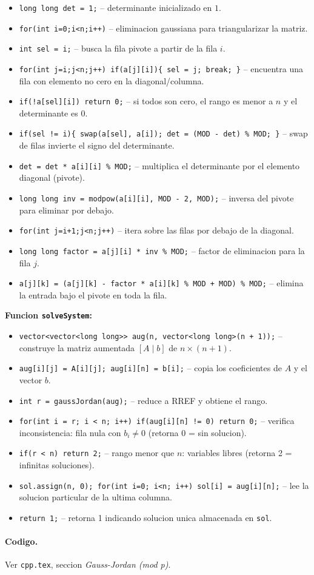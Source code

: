 \begin{itemize}\setlength\itemsep{0pt}
	\item \verb|long long det = 1;| -- determinante inicializado en $1$.
	\item \verb|for(int i=0;i<n;i++)| -- eliminacion gaussiana para triangularizar la matriz.
	\item \verb|int sel = i;| -- busca la fila pivote a partir de la fila $i$.
	\item \verb|for(int j=i;j<n;j++) if(a[j][i]){ sel = j; break; }| -- encuentra una fila con elemento no cero en la diagonal/columna.
	\item \verb|if(!a[sel][i]) return 0;| -- si todos son cero, el rango es menor a $n$ y el determinante es $0$.
	\item \verb|if(sel != i){ swap(a[sel], a[i]); det = (MOD - det) % MOD; }| -- swap de filas invierte el signo del determinante.
	\item \verb|det = det * a[i][i] % MOD;| -- multiplica el determinante por el elemento diagonal (pivote).
	\item \verb|long long inv = modpow(a[i][i], MOD - 2, MOD);| -- inversa del pivote para eliminar por debajo.
	\item \verb|for(int j=i+1;j<n;j++)| -- itera sobre las filas por debajo de la diagonal.
	\item \verb|long long factor = a[j][i] * inv % MOD;| -- factor de eliminacion para la fila $j$.
	\item \verb|a[j][k] = (a[j][k] - factor * a[i][k] % MOD + MOD) % MOD;| -- elimina la entrada bajo el pivote en toda la fila.
\end{itemize}
\textbf{Funcion \texttt{solveSystem}:}
\begin{itemize}\setlength\itemsep{0pt}
	\item \verb|vector<vector<long long>> aug(n, vector<long long>(n + 1));| -- construye la matriz aumentada $[A \mid b]$ de $n \times (n+1)$.
	\item \verb|aug[i][j] = A[i][j]; aug[i][n] = b[i];| -- copia los coeficientes de $A$ y el vector $b$.
	\item \verb|int r = gaussJordan(aug);| -- reduce a RREF y obtiene el rango.
	\item \verb|for(int i = r; i < n; i++) if(aug[i][n] != 0) return 0;| -- verifica inconsistencia: fila nula con $b_i \ne 0$ (retorna 0 = sin solucion).
	\item \verb|if(r < n) return 2;| -- rango menor que $n$: variables libres (retorna 2 = infinitas soluciones).
	\item \verb|sol.assign(n, 0); for(int i=0; i<n; i++) sol[i] = aug[i][n];| -- lee la solucion particular de la ultima columna.
	\item \verb|return 1;| -- retorna 1 indicando solucion unica almacenada en \texttt{sol}.
\end{itemize}

\paragraph{Codigo.}
Ver \texttt{cpp.tex}, seccion \textit{Gauss-Jordan (mod p)}.

\vspace{0.5em}

